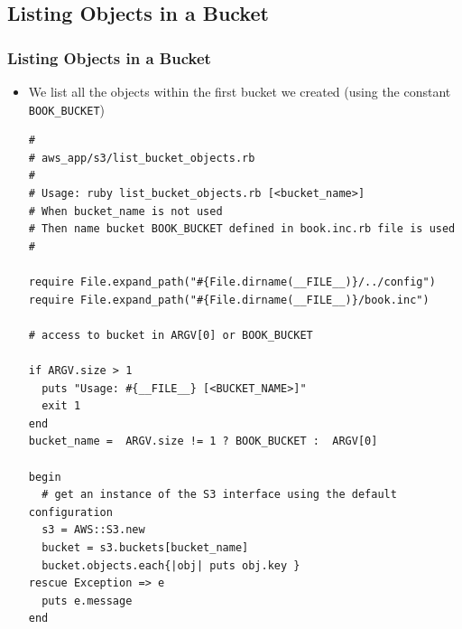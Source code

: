 \documentclass{beamer}
\begin{document}
\subsection{Listing Objects in a Bucket}
\begin{frame}
\frametitle{Listing Objects in a Bucket}
\begin{itemize}
 \item We list all the objects within the first bucket we created (using the constant \texttt{BOOK\_BUCKET})

\lstset{language=Ruby, style=eclipse}
\begin{lstlisting}
#
# aws_app/s3/list_bucket_objects.rb
#
# Usage: ruby list_bucket_objects.rb [<bucket_name>]
# When bucket_name is not used
# Then name bucket BOOK_BUCKET defined in book.inc.rb file is used
#

require File.expand_path("#{File.dirname(__FILE__)}/../config")
require File.expand_path("#{File.dirname(__FILE__)}/book.inc")

# access to bucket in ARGV[0] or BOOK_BUCKET

if ARGV.size > 1
  puts "Usage: #{__FILE__} [<BUCKET_NAME>]"
  exit 1
end
bucket_name =  ARGV.size != 1 ? BOOK_BUCKET :  ARGV[0]

begin
  # get an instance of the S3 interface using the default configuration
  s3 = AWS::S3.new
  bucket = s3.buckets[bucket_name]
  bucket.objects.each{|obj| puts obj.key }
rescue Exception => e
  puts e.message
end
\end{lstlisting}
\end{itemize}

\end{frame}
\end{document}
